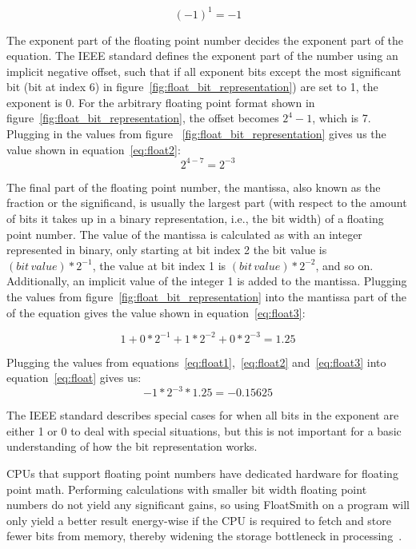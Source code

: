 \begin{equation} \label{eq:float1}
    (-1)^{1} = -1
\end{equation}

The exponent part of the floating point number decides the exponent part of the equation. The IEEE standard defines the exponent part of the number using an implicit negative offset, such that if all exponent bits except the most significant bit (bit at index 6) in figure~\ref{fig:float_bit_representation}) are set to 1, the exponent is 0. For the arbitrary floating point format shown in figure~\ref{fig:float_bit_representation}, the offset becomes $2^4 - 1$, which is 7. Plugging in the values from figure ~\ref{fig:float_bit_representation} gives us the value shown in equation~\ref{eq:float2}:
\begin{equation} \label{eq:float2}
    2^{4-7} = 2^{-3}
\end{equation}

The final part of the floating point number, the mantissa, also known as the fraction or the significand, is usually the largest part (with respect to the amount of bits  it takes up in a binary representation, i.e., the bit width) of a floating point number.
The value of the mantissa is calculated as with an integer represented in binary, only starting at bit index 2 the bit value is $(bit\,value)*2^{-1}$, the value at bit index 1 is $(bit\,value)*2^{-2}$, and so on. Additionally, an implicit value of the integer 1 is added to the mantissa. Plugging the values from figure~\ref{fig:float_bit_representation} into the mantissa part of the of the equation gives the value shown in equation~\ref{eq:float3}:

\begin{equation}\label{eq:float3}
   1 + 0*2^{-1} + 1*2^{-2} + 0*2^{-3} = 1.25
\end{equation}

Plugging the values from equations~\ref{eq:float1},~\ref{eq:float2} and~\ref{eq:float3} into equation~\ref{eq:float} gives us:
\begin{equation}\label{eq:float4}
-1 * 2^{-3} * 1.25 = -0.15625
\end{equation}

The IEEE standard describes special cases for when all bits in the exponent are either 1 or 0 to deal with special situations, but this is not important for a basic understanding of how the bit representation works.


CPUs that support floating point numbers have dedicated hardware for floating point math. Performing calculations with smaller bit width floating point numbers do not yield any significant gains, so using FloatSmith on a program will only yield a better result energy-wise if the CPU is required to fetch and store fewer bits from memory, thereby widening the storage bottleneck in processing~\citep{floatsmith_paper}. 

